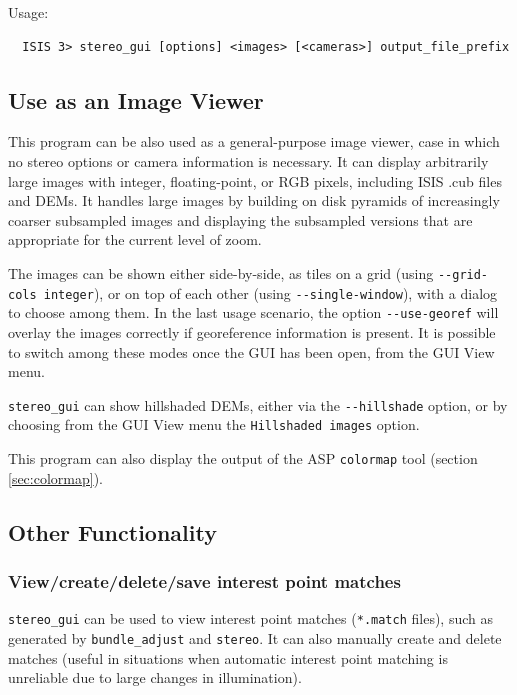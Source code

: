 Usage:
\begin{verbatim}
  ISIS 3> stereo_gui [options] <images> [<cameras>] output_file_prefix
\end{verbatim}

\subsection{Use as an Image Viewer}

This program can be also used as a general-purpose image viewer, case in
which no stereo options or camera information is necessary.  It can
display arbitrarily large images with integer, floating-point, or RGB
pixels, including ISIS .cub files and DEMs. It handles large images by
building on disk pyramids of increasingly coarser subsampled images and
displaying the subsampled versions that are appropriate for the current
level of zoom.

The images can be shown either side-by-side, as tiles on a grid (using
\texttt{-\/-grid-cols integer}), or on top of each other (using
\texttt{-\/-single-window}), with a dialog to choose among them.  In the
last usage scenario, the option \texttt{-\/-use-georef} will overlay the
images correctly if georeference information is present.  It is possible
to switch among these modes once the GUI has been open, from the GUI
View menu.

\texttt{stereo\_gui} can show hillshaded DEMs, either via the
\texttt{-\/-hillshade} option, or by choosing from the GUI View menu the
\texttt{Hillshaded images} option.

This program can also display the output of the ASP \texttt{colormap}
tool (section \ref{sec:colormap}).

\subsection{Other Functionality}

\subsubsection{View/create/delete/save interest point matches}

\texttt{stereo\_gui} can be used to view interest point matches
(\texttt{*.match} files), such as generated by \texttt{bundle\_adjust}
and \texttt{stereo}. It can also manually create and delete
matches (useful in situations when automatic interest point matching is
unreliable due to large changes in illumination).

